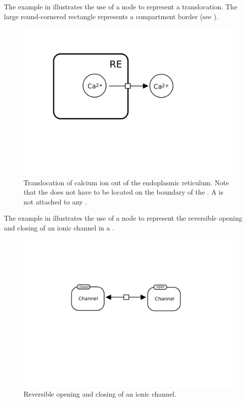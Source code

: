 The example in  illustrates the use of a  node to represent a translocation. The large round-cornered rectangle represents a compartment border (see ).

\begin{figure}[htb]
  \centering
  \includegraphics[scale = 0.3]{examples/process-translocation}
  \caption{Translocation of calcium ion out of the endoplasmic reticulum. Note that the  does not have to be located on the boundary of the . A  is not attached to any .}
  \label{fig:techref:trans-trans}
\end{figure}

The example in  illustrates the use of a  node to represent the reversible opening and closing of an ionic channel in a \PD.

\begin{figure}[htb]
  \centering
  \includegraphics[scale = 0.3]{examples/process-reversible}
  \caption{Reversible opening and closing of an ionic channel.}
  \label{fig:techref:trans-reverse}
\end{figure}

